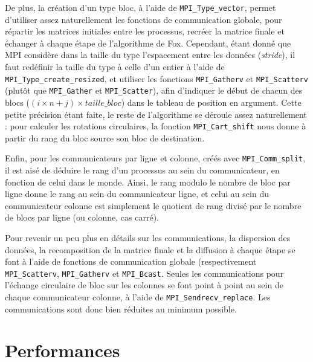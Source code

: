\documentclass[a4paper,11pt]{article}
\begin{document}
De plus, la création d'un type bloc, à l'aide de \texttt{MPI\_Type\_vector}, permet d'utiliser assez naturellement les fonctions de communication globale, pour répartir les matrices initiales entre les processus, recréer la matrice finale et échanger à chaque étape de l'algorithme de Fox.
Cependant, étant donné que MPI considère dans la taille du type l'espacement entre les données (\emph{stride}), il faut redéfinir la taille du type à celle d'un entier à l'aide de \texttt{MPI\_Type\_create\_resized}, et utiliser  les fonctions \texttt{MPI\_Gatherv} et \texttt{MPI\_Scatterv} (plutôt que \texttt{MPI\_Gather} et \texttt{MPI\_Scatter}), afin d'indiquer le début de chacun des blocs ($(i \times n + j) \times \mathit{taille\_bloc}$) dans le tableau de position en argument.
Cette petite précision étant faite, le reste de l'algorithme se déroule assez naturellement : pour calculer les rotations circulaires, la fonction \texttt{MPI\_Cart\_shift} nous donne à partir du rang du bloc source son bloc de destination.

Enfin, pour les communicateurs par ligne et colonne, créés avec \texttt{MPI\_Comm\_split}, il est aisé de déduire le rang d'un processus au sein du communicateur, en fonction de celui dans le monde.
Ainsi, le rang modulo le nombre de bloc par ligne donne le rang au sein du communicateur ligne, et celui au sein du communicateur colonne est simplement le quotient de rang divisé par le nombre de blocs par ligne (ou colonne, cas carré).

Pour revenir un peu plus en détails sur les communications, la dispersion des données, la recomposition de la matrice finale et la diffusion à chaque étape se font à l'aide de fonctions de communication globale (respectivement \texttt{MPI\_Scatterv}, \texttt{MPI\_Gatherv} et \texttt{MPI\_Bcast}.
Seules les communications pour l'échange circulaire de bloc sur les colonnes se font point à point au sein de chaque communicateur colonne, à l'aide de \texttt{MPI\_Sendrecv\_replace}.
Les communications sont donc bien réduites au minimum possible.
 
\section{Performances}
\end{document}
